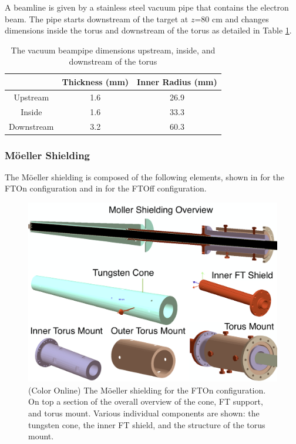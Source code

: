 A beamline is given by a stainless steel vacuum pipe that contains the electron beam.
The pipe starts downstream of the target at $z$=80 cm and changes dimensions inside
the torus and downstream of the torus as detailed in Table \ref{tab:beampipe}.

\begin{table}[h]
	\begin{center}
		\begin{tabular}{| c | c | c |}
			\hline \hline
			                & Thickness (mm) & Inner Radius (mm)   \\
			\hline
              Upstream      &    1.6     &    26.9 \\
              Inside        &    1.6     &    33.3 \\
            Downstream      &    3.2     &    60.3 \\
			\hline \hline
		\end{tabular}
	\end{center}
	\caption{The vacuum beampipe dimensions upstream, inside, and downstream of the torus}\label{tab:beampipe}
\end{table}


\subsubsection{M\"oeller Shielding}
The M\"oeller shielding is composed of the following elements, shown in  for the FTOn configuration
and in  for the FTOff configuration.

\begin{figure}
	\centering
	\includegraphics[width=0.99\columnwidth,keepaspectratio]{img/moellerShieldingFTOn.png}
	\caption{(Color Online) The M\"oeller shielding for the FTOn configuration. On top a section of the overall overview of the cone, FT support, and torus mount.
		     Various individual components are shown: the tungsten cone, the inner FT shield, and the structure of the torus mount.}
	\label{fig:moellerShieldingFTOn}
\end{figure}

